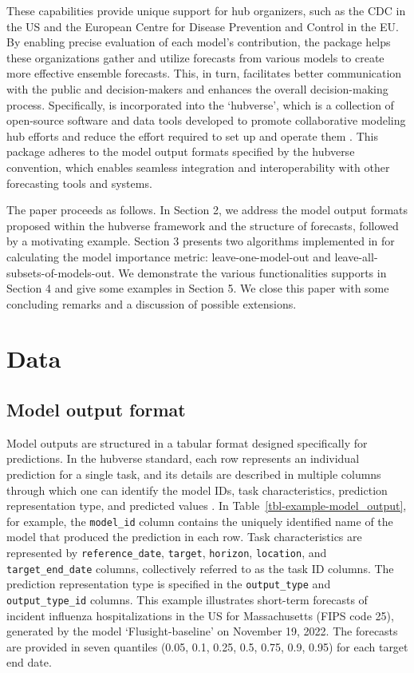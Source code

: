 \documentclass[
  article,
  shortnames,
  notitle]{jss}
\begin{document}
These capabilities provide unique support for hub organizers, such as
the CDC in the US and the European Centre for Disease Prevention and
Control in the EU. By enabling precise evaluation of each model's
contribution, the  package helps these
organizations gather and utilize forecasts from various models to create
more effective ensemble forecasts. This, in turn, facilitates better
communication with the public and decision-makers and enhances the
overall decision-making process. Specifically,  is
incorporated into the `hubverse', which is a collection of open-source
software and data tools developed to promote collaborative modeling hub
efforts and reduce the effort required to set up and operate them
\citep{hubverse_docs}. This package adheres to the model output formats
specified by the hubverse convention, which enables seamless integration
and interoperability with other forecasting tools and systems.

The paper proceeds as follows. In Section 2, we address the model output
formats proposed within the hubverse framework and the structure of
forecasts, followed by a motivating example. Section 3 presents two
algorithms implemented in  for calculating the
model importance metric: leave-one-model-out and
leave-all-subsets-of-models-out. We demonstrate the various
functionalities  supports in Section 4 and give
some examples in Section 5. We close this paper with some concluding
remarks and a discussion of possible extensions.

\section{Data}\label{sec-data}

\subsection{Model output format}\label{subsec-model_output_format}

Model outputs are structured in a tabular format designed specifically
for predictions. In the hubverse standard, each row represents an
individual prediction for a single task, and its details are described
in multiple columns through which one can identify the model IDs, task
characteristics, prediction representation type, and predicted values
\citep{Shandross2024}. In Table~\ref{tbl-example-model_output}, for
example, the \texttt{model\_id} column contains the uniquely identified
name of the model that produced the prediction in each row. Task
characteristics are represented by \texttt{reference\_date},
\texttt{target}, \texttt{horizon}, \texttt{location}, and
\texttt{target\_end\_date} columns, collectively referred to as the task
ID columns. The prediction representation type is specified in the
\texttt{output\_type} and \texttt{output\_type\_id} columns. This
example illustrates short-term forecasts of incident influenza
hospitalizations in the US for Massachusetts (FIPS code 25), generated
by the model `Flusight-baseline' on November 19, 2022. The forecasts are
provided in seven quantiles (0.05, 0.1, 0.25, 0.5, 0.75, 0.9, 0.95) for
each target end date.
\end{document}
